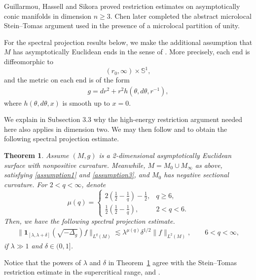 \documentclass[11pt]{amsart}
\newcommand{\la}{\lambda}
\newtheorem{theorem}{Theorem}
\begin{document}
Guillarmou, Hassell and Sikora
\cite{Guillarmou2010RestrictionAS} proved restriction estimates on
asymptotically conic manifolds in dimension $n\geq3$. Chen
\cite{xichen} later completed the abstract microlocal Stein--Tomas
argument used in the presence of a microlocal partition of unity.

For the spectral projection results below, we make the additional
assumption that $M$ has asymptotically Euclidean ends in the sense of
\cite[Section 8]{Guillarmou2010RestrictionAS}. More precisely, each
end is diffeomorphic to
\[
(r_0,\infty)\times\mathbb S^1,
\]
and the metric on each end is of the form
\begin{align}\label{eq:aemetric}
g=dr^2+r^2h(\theta,d\theta,r^{-1}),
\end{align}
where $h(\theta,d\theta,x)$ is smooth up to $x=0$.

We explain in Subsection 3.3 why the high-energy restriction argument
needed here also applies in dimension two. We may then follow
\cite{HSTZ} and \cite{Guillarmou2010RestrictionAS} to obtain the
following spectral projection estimate.
\begin{theorem}\label{specthm}
    Assume $(M,g)$ is a 2-dimensional asymptotically Euclidean surface with nonpositive curvature. Meanwhile, $M=M_0\cup M_\infty$ as above, satisfying \eqref{assumption1} and \eqref{assumption3}, and $M_0$ has negative sectional curvature. For $2<q<\infty$, denote
\begin{equation}\label{ii.2}
\mu(q)=
\begin{cases}
2(\tfrac12-\tfrac1q)-\tfrac12, & q\geq6,\\
\tfrac12(\tfrac12-\tfrac1q), & 2<q<6.
\end{cases}
\end{equation}
Then, we have the following spectral projection estimate.
    \begin{align}\label{eq:stri-nontrap}
    \|\mathbf{1}_{[\la,\la+\delta]}(\sqrt{-\Delta_g})f\|_{L^q(M)}
    \lesssim \la^{\mu(q)}\delta^{1/2}\|f\|_{L^2(M)},
    \qquad 6<q<\infty,
    \end{align}
    if $\la\gg1$ and $\delta\in(0,1]$.
\end{theorem}

Notice that the powers of $\la$ and $\delta$ in Theorem~\ref{specthm} agree with the Stein--Tomas restriction estimate in the supercritical range, \cite{Stein} and \cite{Thomas}.
\end{document}
